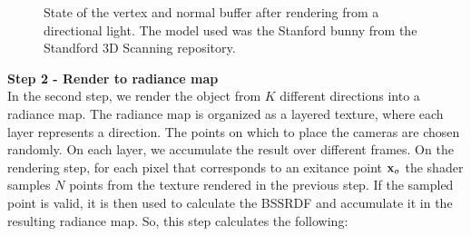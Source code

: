 \begin{figure}
\centering
{}
\label{fig:lightbuffers}
\caption{State of the vertex and normal buffer after rendering from a directional light. The model used was the Stanford bunny from the Standford 3D Scanning repository.}
\end{figure}

\FloatBarrier

\textbf{Step 2 - Render to radiance map} \\
In the second step, we render the object from $K$ different directions into a radiance map. The radiance map is organized as a layered texture, where each layer represents a direction. The points on which to place the cameras are chosen randomly. On each layer, we accumulate the result over different frames. On the rendering step, for each pixel that corresponds to an exitance point $\mathbf{x}_o$ the shader samples $N$ points from the texture rendered in the previous step. If the sampled point is valid, it is then used to calculate the BSSRDF and accumulate it in the resulting radiance map. So, this step calculates the following:

